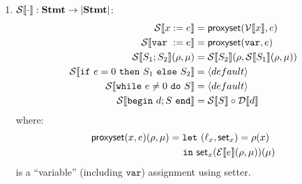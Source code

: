 \documentclass{../../psv}
\newcommand{\Stmt}{\mathbf{Stmt}}
\newcommand{\Vareval}[1]{\mathcal{V}\eval{#1}}
\newcommand{\Expreval}[1]{\mathcal{E}\eval{#1}}
\newcommand{\Decleval}[1]{\mathcal{D}\eval{#1}}
\newcommand{\Stmteval}[1]{\mathcal{S}\eval{#1}}
\newcommand{\offset}{\hspace{1.4em}}
\begin{document}
\begin{enumerate}
    \item $\Stmteval{\cdot}: \Stmt \to \domain{\Stmt}$:
    \begin{align*}
      \Stmteval{x := e} &= \mathsf{proxyset}(\Vareval{x}, e)\\
      \Stmteval{\mathtt{var\ } := e} &= \mathsf{proxyset}(\mathtt{var}, e)\\
      \Stmteval{S_1; S_2} (\rho, \mu) &= \Stmteval{S_2}(\rho, \Stmteval{S_1}(\rho, \mu))\\
      \Stmteval{\mathtt{if\ } e = 0 \mathtt{\ then\ } S_1 \mathtt{\ else\ } S_2} &= \langle default \rangle\\
      \Stmteval{\mathtt{while\ } e \not= 0 \mathtt{\ do\ } S} &= \langle default \rangle\\
      \Stmteval{\mathtt{begin\ } d; S \mathtt{\ end}} &= \Stmteval{S} \circ \Decleval{d}
    \end{align*}
    where:
    \begin{align*}
      \mathsf{proxyset}(x, e)(\rho, \mu) &= \mathtt{let\ } (\ell_x, \mathsf{set}_x) = \rho(x)\\
      &\offset \mathtt{in\ } \mathsf{set}_x(\Expreval{e}(\rho, \mu))(\mu)\\
    \end{align*}
    is a ``variable'' (including $\mathtt{var}$) assignment using setter.
  \end{enumerate}
\end{document}
